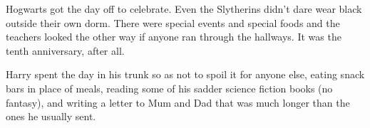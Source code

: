 Hogwarts got the day off to celebrate. Even the Slytherins didn't dare wear 
black outside their own dorm. There were special events and special foods and 
the teachers looked the other way if anyone ran through the hallways. It was 
the tenth anniversary, after all.

Harry spent the day in his trunk so as not to spoil it for anyone else, eating 
snack bars in place of meals, reading some of his sadder science fiction books 
(no fantasy), and writing a letter to Mum and Dad that was much longer than the 
ones he usually sent.